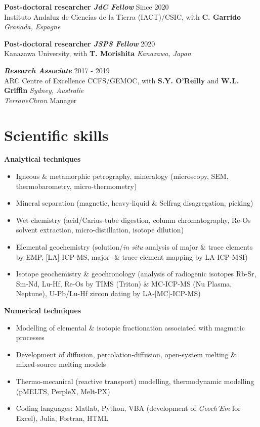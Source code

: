 \documentclass[a4paper,11pt]{article}
\begin{document}
    \textbf{Post-doctoral researcher \textit{JdC Fellow}}
    \hfill {Since 2020}\\
    Instituto Andaluz de Ciencias de la Tierra (IACT)/CSIC, with \textbf{C. Garrido}
    \hfill \textit{Granada, Espagne}
     
    \textbf{Post-doctoral researcher \textit{JSPS Fellow}}
    \hfill {2020}\\
    Kanazawa University, with \textbf{T. Morishita}
    \hfill \textit{Kanazawa, Japan}
    
    \textbf{\textit{Research Associate}}
    \hfill {2017 - 2019}\\
    ARC Centre of Excellence CCFS/GEMOC, with \textbf{S.Y. O'Reilly} and \textbf{W.L. Griffin}
    \hfill \textit{Sydney, Australie}\\
    \textit{TerraneChron} Manager
    
\section{Scientific skills}

    \textbf{Analytical techniques} 
    \begin{itemize}[itemsep=0pt,parsep=2pt]
        \item Igneous \& metamorphic petrography, mineralogy (microscopy, SEM, thermobarometry, micro-thermometry)
        \item Mineral separation (magnetic, heavy-liquid \& Selfrag disagregation, picking)
        \item Wet chemistry (acid/Carius-tube digestion, column chromatography, Re-Os solvent extraction, micro-distillation, isotope dilution)
        \item Elemental geochemistry (solution/\textit{in situ} analysis of major \& trace elements by EMP, [LA]-ICP-MS, major- \& trace-element mapping by LA-ICP-MSI)
        \item Isotope geochemistry \& geochronology (analysis of radiogenic isotopes Rb-Sr, Sm-Nd, Lu-Hf, Re-Os by TIMS (Triton) \& MC-ICP-MS (Nu Plasma, Neptune), U-Pb/Lu-Hf zircon dating by LA-[MC]-ICP-MS)
    \end{itemize}
    
    \textbf{Numerical techniques}
    \begin{itemize}[itemsep=0pt,parsep=2pt]
        \item Modelling of elemental \& isotopic fractionation associated with magmatic processes
        \item Development of diffusion, percolation-diffusion, open-system melting \& mixed-source melting models
        \item Thermo-mecanical (reactive transport) modelling, thermodynamic modelling (pMELTS, PerpleX, Melt-PX)
        \item Coding languages: Matlab, Python, VBA (development of \textit{Geoch’Em} for Excel), Julia, Fortran, HTML
        
    \end{itemize}
    
\end{document}
